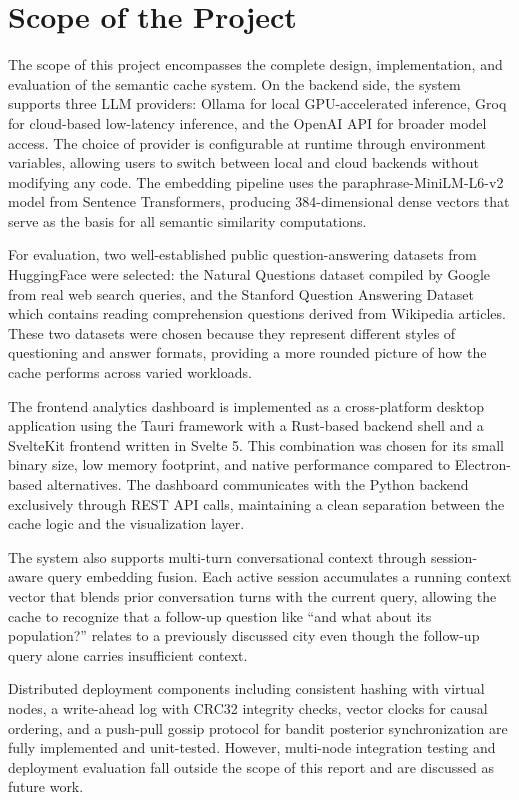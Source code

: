 \documentclass[12pt,a4paper]{report}
\begin{document}
\section{Scope of the Project}

The scope of this project encompasses the complete design, implementation, and evaluation of the semantic cache system. On the backend side, the system supports three LLM providers: Ollama for local GPU-accelerated inference, Groq for cloud-based low-latency inference, and the OpenAI API for broader model access. The choice of provider is configurable at runtime through environment variables, allowing users to switch between local and cloud backends without modifying any code. The embedding pipeline uses the paraphrase-MiniLM-L6-v2 model from Sentence Transformers, producing 384-dimensional dense vectors that serve as the basis for all semantic similarity computations.

For evaluation, two well-established public question-answering datasets from HuggingFace were selected: the Natural Questions dataset compiled by Google from real web search queries, and the Stanford Question Answering Dataset which contains reading comprehension questions derived from Wikipedia articles. These two datasets were chosen because they represent different styles of questioning and answer formats, providing a more rounded picture of how the cache performs across varied workloads.

The frontend analytics dashboard is implemented as a cross-platform desktop application using the Tauri framework with a Rust-based backend shell and a SvelteKit frontend written in Svelte 5. This combination was chosen for its small binary size, low memory footprint, and native performance compared to Electron-based alternatives. The dashboard communicates with the Python backend exclusively through REST API calls, maintaining a clean separation between the cache logic and the visualization layer.

The system also supports multi-turn conversational context through session-aware query embedding fusion. Each active session accumulates a running context vector that blends prior conversation turns with the current query, allowing the cache to recognize that a follow-up question like ``and what about its population?'' relates to a previously discussed city even though the follow-up query alone carries insufficient context.

Distributed deployment components including consistent hashing with virtual nodes, a write-ahead log with CRC32 integrity checks, vector clocks for causal ordering, and a push-pull gossip protocol for bandit posterior synchronization are fully implemented and unit-tested. However, multi-node integration testing and deployment evaluation fall outside the scope of this report and are discussed as future work.
\end{document}
